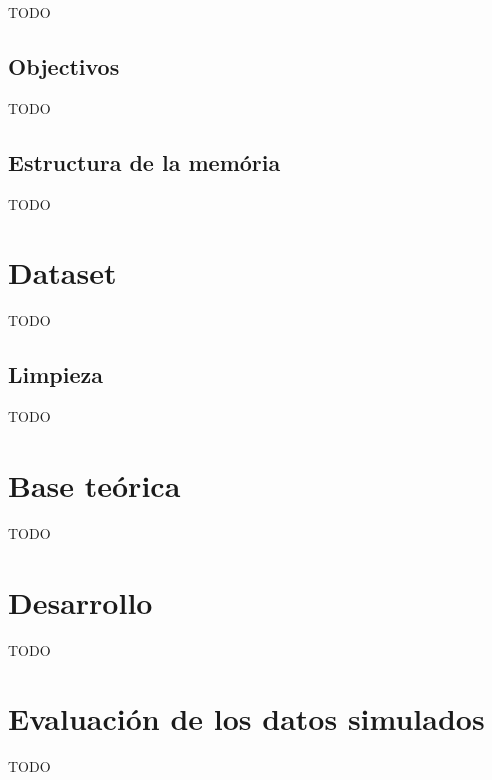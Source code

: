 \documentclass[11pt,spanish,listoffigures,listoftables]{tfgetsinf}
\begin{document}
TODO

\section{Objectivos}

TODO

\section{Estructura de la memória}

TODO




\chapter{Dataset}

TODO

\section{Limpieza}

TODO

\chapter{Base teórica}

TODO

\chapter{Desarrollo}

TODO

\chapter{Evaluación de los datos simulados}

TODO
\end{document}
